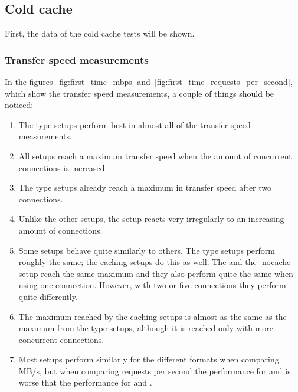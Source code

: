 \documentclass[twoside,openright]{uva-bachelor-thesis}
\begin{document}
\subsection{Cold cache}
First, the data of the cold cache tests will be shown.

\subsubsection{Transfer speed measurements}
In the figures~\ref{fig:first_time_mbps}
and~\ref{fig:first_time_requests_per_second}, which show the transfer speed
measurements, a couple of things should be noticed:
\begin{enumerate}
    \item
        The \cdn type setups perform best in almost all of the transfer
        speed measurements.

    \item
        All setups reach a maximum transfer speed when the amount of concurrent
        connections is increased.

    \item
        The \cdn type setups already reach a maximum in transfer speed
        after two connections.

    \item
        Unlike the other setups, the \ipp setup reacts very irregularly to
        an increasing amount of connections.

    \item
        Some setups behave quite similarly to others. The \cdn type setups perform
        roughly the same; the caching \lt setups do this as well. The \ipp
        and the \lt-nocache setup reach the same maximum and they also perform
        quite the same when using one connection. However, with two or five
        connections they perform quite differently.

    \item
        The maximum reached by the caching \lt setups is almost as the same as
        the maximum from the \cdn type setups, although it is reached only with
        more concurrent connections.

    \item
        Most setups perform similarly for the different formats when comparing
        MB/s, but when comparing requests per second the performance for \hds
        and \hls is worse that the performance for \dash and \iss.

\end{enumerate}
\end{document}
